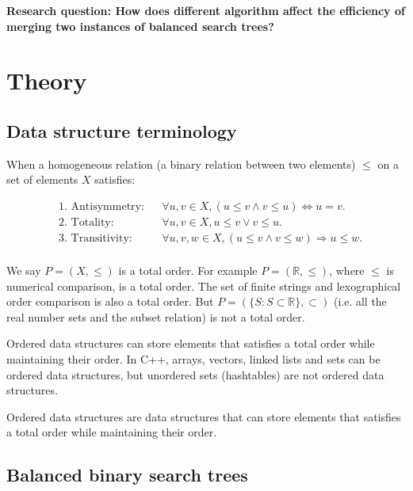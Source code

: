 \documentclass[12pt]{article}
\begin{document}
\textbf{Research question: How does different algorithm affect the efficiency of merging two instances of balanced search trees?}

\section{Theory}

\subsection{Data structure terminology}

When a homogeneous relation (a binary relation between two elements) $\le$ on a set of elements $X$ satisfies:

\begin{align*}
&\text{1. Antisymmetry:} && \forall u, v \in X, (u \le v \land v \le u) \Leftrightarrow u = v. \\
&\text{2. Totality:} && \forall u, v \in X, u \le v \lor v \le u. \\
&\text{3. Transitivity:} && \forall u, v, w \in X, (u \le v \land v \le w) \Rightarrow u \le w.\\
\end{align*}

We say $P = (X, \le)$ is a total order. For example $P = (\mathbb{R}, \le)$, where $\le$ is numerical comparison, is a total order. The set of finite strings and lexographical order comparison is also a total order. But $P = (\{S: S\subset \mathbb{R}\}, \subset)$ (i.e. all the real number sets and the subset relation) is not a total order.

Ordered data structures can store elements that satisfies a total order while maintaining their order. In C++, arrays, vectors, linked lists and sets can be ordered data structures, but unordered sets (hashtables) are not ordered data structures.

\begin{tcolorbox}[title=Definition]
    Ordered data structures are data structures that can store elements that satisfies a total order while maintaining their order.
\end{tcolorbox}

\subsection{Balanced binary search trees}
\end{document}
